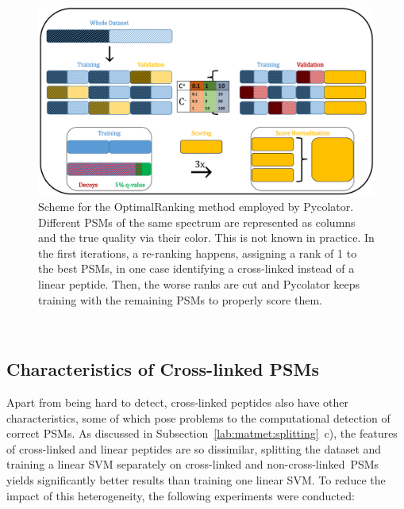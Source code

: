 \begin{figure}
	\normalsize
	\centering
	\includegraphics[width = \textwidth, page=2]{figures/Pycolator_diagram.pdf}
	\caption[How Pycolator deals with ranked PSMs]{Scheme for the OptimalRanking method employed by Pycolator. Different PSMs of the same spectrum are represented as columns and the true quality via their color. This is not known in practice. In the first iterations, a re-ranking happens, assigning a rank of 1 to the best PSMs, in one case identifying a cross-linked instead of a linear peptide. Then, the worse ranks are cut and Pycolator keeps training with the remaining PSMs to properly score them.}
	\label{fig:optimalRanking_outline}
\end{figure}
\renewcommand{\baselinestretch}{1}\\
\subsection{Characteristics of Cross-linked PSMs}
Apart from being hard to detect, cross-linked peptides also have other characteristics, some of which pose problems to the computational detection of correct PSMs. As discussed in Subsection~\ref{lab:matmet:splitting}~c), the features of cross-linked and linear peptides are so dissimilar, splitting the dataset and training a linear SVM separately on cross-linked and non-cross-linked~PSMs yields significantly better results than training one linear SVM. To reduce the impact of this heterogeneity, the following experiments were conducted:
